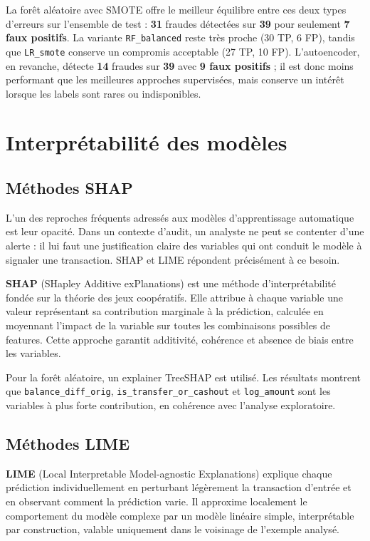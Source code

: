 \documentclass[12pt,a4paper,twoside]{report}
\begin{document}
La forêt aléatoire avec SMOTE offre le meilleur équilibre entre ces deux types d'erreurs sur l'ensemble de test : \textbf{31} fraudes détectées sur \textbf{39} pour seulement \textbf{7 faux positifs}. La variante \texttt{RF\_balanced} reste très proche (30 TP, 6 FP), tandis que \texttt{LR\_smote} conserve un compromis acceptable (27 TP, 10 FP). L'autoencoder, en revanche, détecte \textbf{14} fraudes sur \textbf{39} avec \textbf{9 faux positifs} ; il est donc moins performant que les meilleures approches supervisées, mais conserve un intérêt lorsque les labels sont rares ou indisponibles.

\section{Interprétabilité des modèles}

\subsection{Méthodes SHAP}

L'un des reproches fréquents adressés aux modèles d'apprentissage automatique est leur opacité. Dans un contexte d'audit, un analyste ne peut se contenter d'une alerte : il lui faut une justification claire des variables qui ont conduit le modèle à signaler une transaction. SHAP et LIME répondent précisément à ce besoin.

\begin{definitionbox}
\textbf{SHAP} (SHapley Additive exPlanations) est une méthode d'interprétabilité fondée sur la théorie des jeux coopératifs. Elle attribue à chaque variable une valeur représentant sa contribution marginale à la prédiction, calculée en moyennant l'impact de la variable sur toutes les combinaisons possibles de features. Cette approche garantit additivité, cohérence et absence de biais entre les variables.
\end{definitionbox}

Pour la forêt aléatoire, un explainer TreeSHAP est utilisé. Les résultats montrent que \texttt{balance\_diff\_orig}, \texttt{is\_transfer\_or\_cashout} et \texttt{log\_amount} sont les variables à plus forte contribution, en cohérence avec l'analyse exploratoire.

\subsection{Méthodes LIME}

\begin{definitionbox}
\textbf{LIME} (Local Interpretable Model-agnostic Explanations) explique chaque prédiction individuellement en perturbant légèrement la transaction d'entrée et en observant comment la prédiction varie. Il approxime localement le comportement du modèle complexe par un modèle linéaire simple, interprétable par construction, valable uniquement dans le voisinage de l'exemple analysé.
\end{definitionbox}
\end{document}

